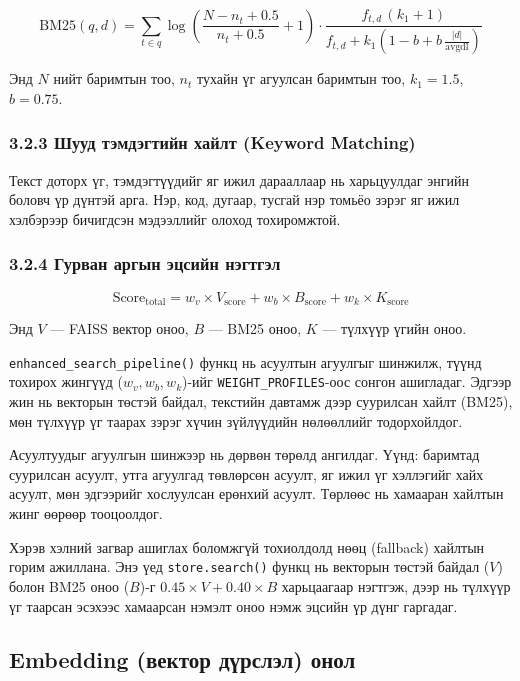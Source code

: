 \documentclass[11pt,a4paper]{article}
\begin{document}
\[
  \text{BM25}(q,d) = \sum_{t \in q}
    \log\!\left(\frac{N - n_t + 0.5}{n_t + 0.5}+1\right)
    \cdot
    \frac{f_{t,d}\,(k_1+1)}{f_{t,d} + k_1\!\left(1-b+b\,\frac{|d|}{\text{avgdl}}\right)}
\]

Энд $N$ нийт баримтын тоо, $n_t$ тухайн үг агуулсан баримтын тоо, $k_1=1.5$, $b=0.75$.

\subsubsection*{3.2.3 Шууд тэмдэгтийн хайлт (Keyword Matching)}

Текст доторх үг, тэмдэгтүүдийг яг ижил дарааллаар нь харьцуулдаг энгийн боловч үр дүнтэй арга. Нэр, код, дугаар, тусгай нэр томьёо зэрэг яг ижил хэлбэрээр бичигдсэн мэдээллийг олоход тохиромжтой.

\subsubsection*{3.2.4 Гурван аргын эцсийн нэгтгэл}

\[
  \text{Score}_{\text{total}} =
            w_v \times V_{\text{score}} +
            w_b \times B_{\text{score}} +
            w_k \times K_{\text{score}}
\]

Энд $V$ — FAISS вектор оноо, $B$ — BM25 оноо, $K$ — түлхүүр үгийн оноо.

 \texttt{enhanced\_search\_pipeline()} функц нь асуултын агуулгыг 
шинжилж, түүнд тохирох жингүүд ($w_v, w_b, w_k$)-ийг 
\texttt{WEIGHT\_PROFILES}-оос сонгон ашигладаг. Эдгээр жин нь 
векторын төстэй байдал, текстийн давтамж дээр суурилсан хайлт 
(BM25), мөн түлхүүр үг таарах зэрэг хүчин зүйлүүдийн 
нөлөөллийг тодорхойлдог.
      
Асуултуудыг агуулгын шинжээр нь дөрвөн төрөлд ангилдаг. 
Үүнд: баримтад суурилсан асуулт, утга агуулгад төвлөрсөн асуулт, 
яг ижил үг хэллэгийг хайх асуулт, мөн эдгээрийг хослуулсан 
ерөнхий асуулт. Төрлөөс нь хамааран хайлтын жинг өөрөөр 
тооцоолдог.

Хэрэв хэлний загвар ашиглах боломжгүй тохиолдолд 
нөөц (fallback) хайлтын горим ажиллана. Энэ үед 
\texttt{store.search()} функц нь векторын төстэй байдал ($V$) 
болон BM25 оноо ($B$)-г $0.45 \times V + 0.40 \times B$ 
харьцаагаар нэгтгэж, дээр нь түлхүүр үг таарсан эсэхээс 
хамаарсан нэмэлт оноо нэмж эцсийн үр дүнг гаргадаг.
\subsection{Embedding (вектор дүрслэл) онол}
\end{document}
